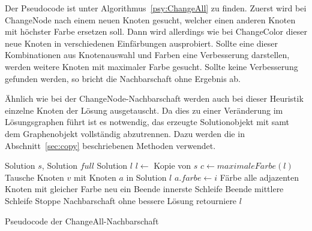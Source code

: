 Der Pseudocode ist unter Algorithmus~\ref{psy:ChangeAll} zu finden. Zuerst wird bei ChangeNode nach einem neuen Knoten gesucht, welcher einen anderen Knoten mit höchster Farbe ersetzen soll. Dann wird
allerdings wie bei ChangeColor dieser neue Knoten in verschiedenen Einfärbungen ausprobiert. Sollte eine dieser Kombinationen aus Knotenauswahl und Farben eine Verbesserung darstellen, werden weitere Knoten
mit maximaler Farbe gesucht. Sollte keine Verbesserung gefunden werden, so bricht die Nachbarschaft ohne Ergebnis ab.

Ähnlich wie bei der ChangeNode-Nachbarschaft werden auch bei dieser Heuristik einzelne Knoten der Lösung ausgetauscht. Da dies zu einer Veränderung im Lösungsgraphen führt ist es notwendig, das erzeugte
Solutionobjekt mit samt dem Graphenobjekt vollständig abzutrennen. Dazu werden die in Abschnitt~\ref{sec:copy} beschriebenen Methoden verwendet.

\begin{algorithm}
\begin{algorithmic}[1]
\Require Solution $s$, Solution $full$
\Ensure Solution $l$
\State $l \leftarrow$ Kopie von $s$
\State $c \leftarrow maximaleFarbe(l)$
\State Tausche Knoten $v$ mit Knoten $a$ in Solution $l$
\State $a.farbe \leftarrow i$
\State Färbe alle adjazenten Knoten mit gleicher Farbe neu ein
\State Beende innerste Schleife  
\EndIf
\EndFor
{}
\State Beende mittlere Schleife  
\EndIf
\EndFor
{}
\State Stoppe Nachbarschaft ohne bessere Lösung
\EndIf
\EndFor
\State retourniere $l$
\end{algorithmic}
\caption{Pseudocode der ChangeAll-Nachbarschaft}
\label{psy:ChangeAll}
\end{algorithm}
 
